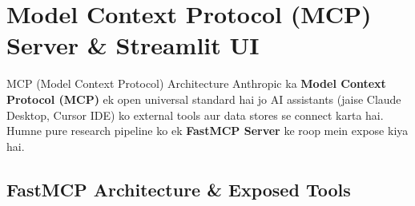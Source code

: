 \documentclass[9.5pt, a4paper]{article}
\begin{document}
\clearpage
\section{Model Context Protocol (MCP) Server \& Streamlit UI}

\begin{conceptbox}{MCP (Model Context Protocol) Architecture}
Anthropic ka \textbf{Model Context Protocol (MCP)} ek open universal standard hai jo AI assistants (jaise Claude Desktop, Cursor IDE) ko external tools aur data stores se connect karta hai. Humne pure research pipeline ko ek \textbf{FastMCP Server} ke roop mein expose kiya hai.
\end{conceptbox}

\vspace{-4pt}
\subsection{FastMCP Architecture \& Exposed Tools}
\end{document}
